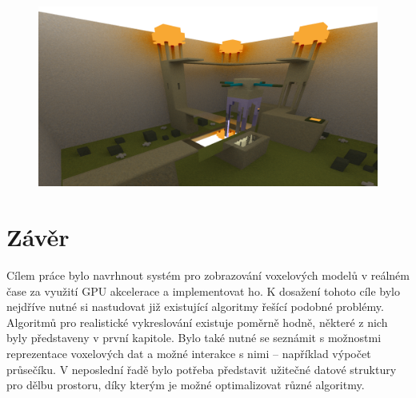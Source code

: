 \begin{figure}[H]
	\centering
	\captionsetup{justification=centering}
	\includegraphics[scale=0.9]{images/indirect_render_2.png}
	\label{fig:indirect_render_2}
\end{figure}


\chapter{Závěr}\label{zaver}
Cílem práce bylo navrhnout systém pro zobrazování voxelových modelů v reálném čase za využití GPU akcelerace a implementovat ho. K dosažení tohoto cíle bylo nejdříve nutné si nastudovat již existující algoritmy řešící podobné problémy. Algoritmů pro realistické vykreslování existuje poměrně hodně, některé z nich byly představeny v první kapitole. Bylo také nutné se seznámit s možnostmi reprezentace voxelových dat a možné interakce s nimi -- například výpočet průsečíku. V neposlední řadě bylo potřeba představit užitečné datové struktury pro dělbu prostoru, díky kterým je možné optimalizovat různé algoritmy.

